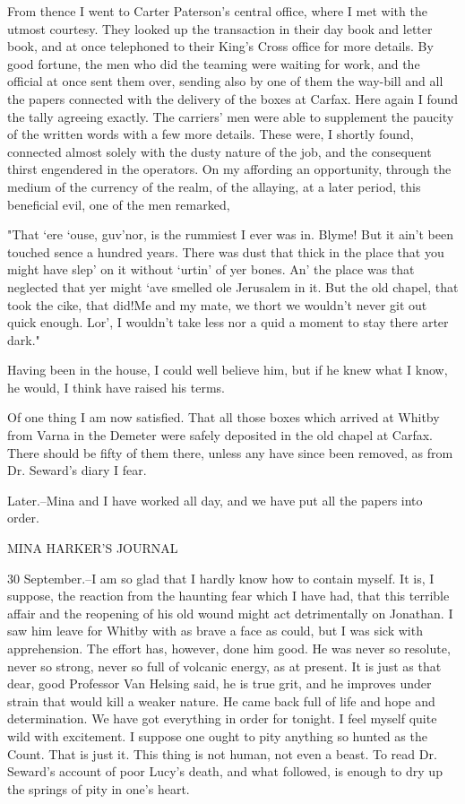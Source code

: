 From thence I went to Carter Paterson's central office, where I met with the utmost courtesy. They looked up the transaction in their day book and letter book, and at once telephoned to their King's Cross office for more details. By good fortune, the men who did the teaming were waiting for work, and the official at once sent them over, sending also by one of them the way-bill and all the papers connected with the delivery of the boxes at Carfax. Here again I found the tally agreeing exactly. The carriers' men were able to supplement the paucity of the written words with a few more details. These were, I shortly found, connected almost solely with the dusty nature of the job, and the consequent thirst engendered in the operators. On my affording an opportunity, through the medium of the currency of the realm, of the allaying, at a later period, this beneficial evil, one of the men remarked, 

"That `ere `ouse, guv'nor, is the rummiest I ever was in. Blyme! But it ain't been touched sence a hundred years. There was dust that thick in the place that you might have slep' on it without `urtin' of yer bones. An' the place was that neglected that yer might `ave smelled ole Jerusalem in it. But the old chapel, that took the cike, that did!Me and my mate, we thort we wouldn't never git out quick enough. Lor', I wouldn't take less nor a quid a moment to stay there arter dark." 

Having been in the house, I could well believe him, but if he knew what I know, he would, I think have raised his terms. 

Of one thing I am now satisfied. That all those boxes which arrived at Whitby from Varna in the Demeter were safely deposited in the old chapel at Carfax. There should be fifty of them there, unless any have since been removed, as from Dr. Seward's diary I fear. 

Later.--Mina and I have worked all day, and we have put all the papers into order. 

MINA HARKER'S JOURNAL 

30 September.--I am so glad that I hardly know how to contain myself. It is, I suppose, the reaction from the haunting fear which I have had, that this terrible affair and the reopening of his old wound might act detrimentally on Jonathan. I saw him leave for Whitby with as brave a face as could, but I was sick with apprehension. The effort has, however, done him good. He was never so resolute, never so strong, never so full of volcanic energy, as at present. It is just as that dear, good Professor Van Helsing said, he is true grit, and he improves under strain that would kill a weaker nature. He came back full of life and hope and determination. We have got everything in order for tonight. I feel myself quite wild with excitement. I suppose one ought to pity anything so hunted as the Count. That is just it. This thing is not human, not even a beast. To read Dr. Seward's account of poor Lucy's death, and what followed, is enough to dry up the springs of pity in one's heart. 

